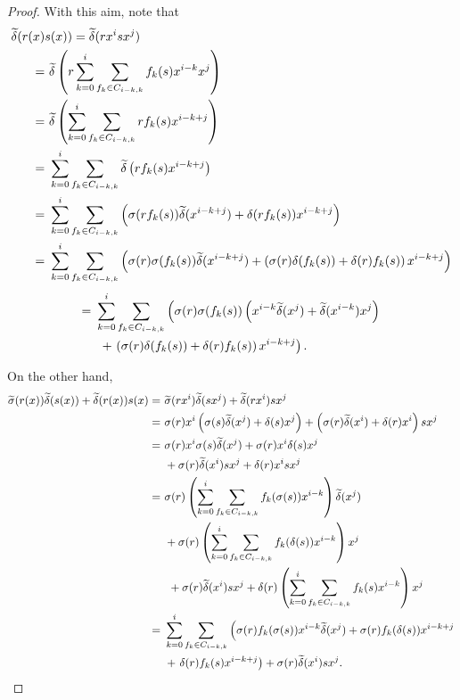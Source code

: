 \documentclass[10pt,a4paper]{amsart}
\begin{document}
\begin{proof}
With this aim, note that 
\begin{align}
    \widetilde{\delta}(r(x) & s(x)) = \widetilde{\delta}(r x^is x^j) \notag \\ 
    = &\ \widetilde{\delta}\left(r\sum_{k=0}^{i}\sum_{f_k\in C_{i-k,k}}f_k(s) x^{i-k} x^j\right) \notag \\
     = &\ \widetilde{\delta}\left(\sum_{k=0}^{i}\sum_{f_k\in C_{i-k,k}} r f_k(s) x^{i-k+j}\right) \notag \\ 
     = &\ \sum_{k=0}^{i}\sum_{f_k\in C_{i-k,k}}\widetilde{\delta}\left(rf_k(s) x^{i-k+j}\right) \notag \\
     = &\ \sum_{k=0}^{i}\sum_{f_k\in C_{i-k,k}}\left(\sigma(rf_k(s))\widetilde{\delta} (x^{i-k+j}) + \delta(rf_k(s)) x^{i-k+j}\right) \notag \\
     = &\ \sum_{k=0}^{i}\sum_{f_k\in C_{i-k,k}}\left(\sigma(r)\sigma(f_k(s))\widetilde{\delta}(x^{i-k+j})+\left(\sigma(r)\delta(f_k(s))+\delta(r)f_k(s)\right) x^{i-k+j}\right) \notag 
     \end{align}
    \begin{align} 
     = &\ \sum_{k=0}^{i} \sum_{f_k\in C_{i-k,k}} \left(\sigma(r)\sigma(f_k(s))\left(x^{i-k}\widetilde{\delta}(x^j) + \widetilde{\delta}(x^{i-k}) x^j\right) \right. \notag \\
     &\ \ + \left. \left(\sigma(r)\delta(f_k(s)) + \delta(r)f_k(s)\right) x^{i-k+j} \right). \label{First24}
\end{align}

On the other hand,
{\small{
\begin{align}
    \widetilde{\sigma}(r(x)) \widetilde{\delta}(s(x)) + \widetilde{\delta}(r(x))s(x) = &\ \widetilde{\sigma}(r x^i)\widetilde{\delta}(s x^j)+\widetilde{\delta}(r x^i) sx^j \notag \\
    = &\ \sigma(r) x^i\left(\sigma(s)\widetilde{\delta}(x^j) + \delta(s) x^j\right) + \left(\sigma(r)\widetilde{\delta}(x^i) + \delta(r) x^i\right)s x^j \notag \\
    = &\ \sigma(r) x^i \sigma(s)\widetilde{\delta}(x^j) + \sigma(r) x^i\delta(s) x^j \\
    &\ + \sigma(r)\widetilde{\delta}(x^i) sx^j + \delta(r) x^is x^j \notag \\
    = &\ \sigma(r)\left(\sum_{k=0}^{i}\sum_{f_k\in C_{i-k,k}}f_k(\sigma(s)) x^{i-k}\right)\widetilde{\delta}(x^j) \\
    &\ + \sigma(r)\left(\sum_{k=0}^{i}\sum_{f_k\in C_{i-k,k}}f_k(\delta(s)) x^{i-k}\right) x^j \notag \\ &\ \ + \sigma(r)\widetilde{\delta}(x^i) s x^j + \delta(r) \left(\sum_{k=0}^{i}\sum_{f_k\in C_{i-k,k}}f_k(s) x^{i-k}\right)x^j \notag \\
    = &\ \sum_{k=0}^{i}\sum_{f_k\in C_{i-k,k}}\left(\sigma(r)f_k(\sigma(s)) x^{i-k}\widetilde{\delta}(x^j) + \sigma(r)f_k(\delta(s)) x^{i-k+j} \right. \\
    &\ + \left. \delta(r)f_k(s) x^{i-k+j}\right) + \sigma(r)\widetilde{\delta}(x^i)s x^j. \label{Second24}
\end{align}
}}


\end{proof}
\end{document}
